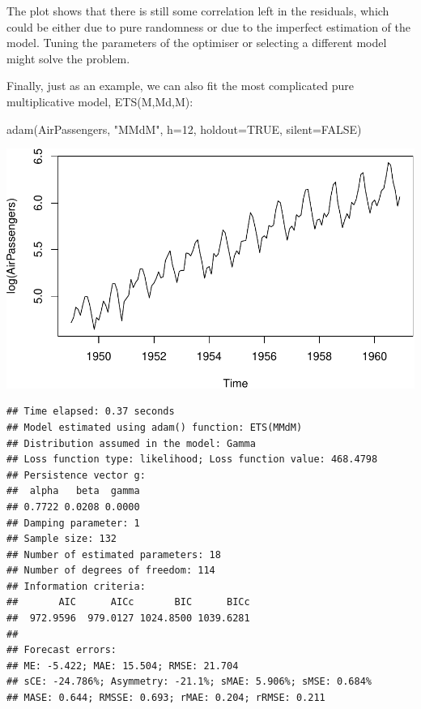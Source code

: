 \documentclass[
]{book}
\newenvironment{Shaded}{\begin{snugshade}}{\end{snugshade}}
\newcommand{\AttributeTok}[1]{\textcolor[rgb]{0.77,0.63,0.00}{#1}}
\newcommand{\ConstantTok}[1]{\textcolor[rgb]{0.00,0.00,0.00}{#1}}
\newcommand{\DecValTok}[1]{\textcolor[rgb]{0.00,0.00,0.81}{#1}}
\newcommand{\FunctionTok}[1]{\textcolor[rgb]{0.00,0.00,0.00}{#1}}
\newcommand{\NormalTok}[1]{#1}
\newcommand{\StringTok}[1]{\textcolor[rgb]{0.31,0.60,0.02}{#1}}
\theoremstyle{definition}
\theoremstyle{definition}
\theoremstyle{definition}
\theoremstyle{definition}
\theoremstyle{remark}
\begin{document}
The plot shows that there is still some correlation left in the residuals, which could be either due to pure randomness or due to the imperfect estimation of the model. Tuning the parameters of the optimiser or selecting a different model might solve the problem.

Finally, just as an example, we can also fit the most complicated pure multiplicative model, ETS(M,Md,M):

\begin{Shaded}
\begin{Highlighting}[]
\FunctionTok{adam}\NormalTok{(AirPassengers, }\StringTok{"MMdM"}\NormalTok{, }\AttributeTok{h=}\DecValTok{12}\NormalTok{, }\AttributeTok{holdout=}\ConstantTok{TRUE}\NormalTok{, }\AttributeTok{silent=}\ConstantTok{FALSE}\NormalTok{)}
\end{Highlighting}
\end{Shaded}

\includegraphics{adam_files/figure-latex/unnamed-chunk-50-1.pdf}

\begin{verbatim}
## Time elapsed: 0.37 seconds
## Model estimated using adam() function: ETS(MMdM)
## Distribution assumed in the model: Gamma
## Loss function type: likelihood; Loss function value: 468.4798
## Persistence vector g:
##  alpha   beta  gamma 
## 0.7722 0.0208 0.0000 
## Damping parameter: 1
## Sample size: 132
## Number of estimated parameters: 18
## Number of degrees of freedom: 114
## Information criteria:
##       AIC      AICc       BIC      BICc 
##  972.9596  979.0127 1024.8500 1039.6281 
## 
## Forecast errors:
## ME: -5.422; MAE: 15.504; RMSE: 21.704
## sCE: -24.786%; Asymmetry: -21.1%; sMAE: 5.906%; sMSE: 0.684%
## MASE: 0.644; RMSSE: 0.693; rMAE: 0.204; rRMSE: 0.211
\end{verbatim}
\end{document}
